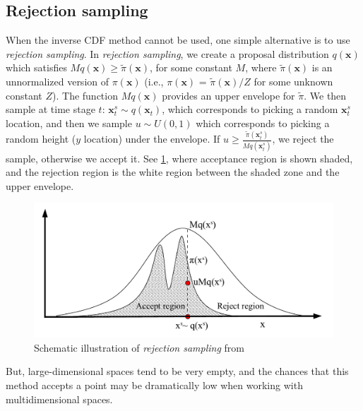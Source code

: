 \subsection{Rejection sampling}
When the inverse \acrshort{CDF} method cannot be used, one simple alternative is to use \textit{rejection sampling}. In \textit{rejection sampling}, we create a proposal distribution $q(\boldsymbol{x})$ which satisfies $Mq(\boldsymbol{x}) \geq \tilde{\pi}(\boldsymbol{x})$, for some constant $M$, where $\tilde{\pi}(\boldsymbol{x})$ is an unnormalized version of $\pi(\boldsymbol{x})$ (i.e., $\pi(\boldsymbol{x})$ = $\tilde{\pi}(\boldsymbol{x})/Z$ for some unknown constant $Z$). The function $Mq(\boldsymbol{x})$ provides an upper envelope for $\tilde{\pi}$. We then sample at time stage $t$: $\boldsymbol{x}_{t}^{s} \sim q(\boldsymbol{x}_{t})$, which corresponds to picking a random $\boldsymbol{x}_{t}^{s}$ location, and then we sample $u \sim U(0,1)$ which corresponds to picking a random height ($y$ location) under the
envelope. If $u \geq \frac{\tilde{\pi}(\boldsymbol{x}_{t}^{s})}{Mq(\boldsymbol{x}_{t}^{s})}$, we reject the sample, otherwise we accept it. See \cref{fig: rejectsampling}, where acceptance region is shown shaded, and the rejection region is the white region between the shaded zone and the upper envelope.
\begin{figure}[htbp]
    \centering
    \includegraphics[width = 140mm]{Figures/figure-rejectionsampling.pdf}
    \caption{Schematic illustration of \textit{rejection sampling} from \protect\cite{andrieu2003}}
    \label{fig: rejectsampling}
\end{figure}
But, large-dimensional spaces tend to be very empty, and the chances that this method accepts a point may be dramatically low when working with multidimensional spaces.
